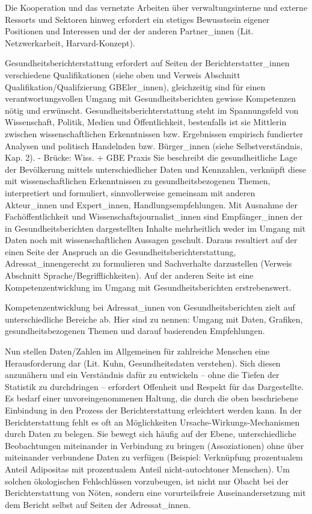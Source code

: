 \documentclass{article}
\begin{document}
Die Kooperation und das vernetzte Arbeiten über verwaltungsinterne und externe Ressorts und Sektoren hinweg erfordert ein stetiges Bewusstsein eigener Positionen und Interessen und der der anderen Partner\_innen (Lit. Netzwerkarbeit, Harvard-Konzept).


Gesundheitsberichterstattung erfordert auf Seiten der Berichterstatter\_innen verschiedene Qualifikationen (siehe oben und Verweis Abschnitt Qualifikation/Qualifzierung GBEler\_innen), gleichzeitig sind für einen verantwortungsvollen Umgang mit Gesundheitsberichten gewisse Kompetenzen nötig und erwünscht. Gesundheitsberichterstattung steht im Spannungsfeld von Wissenschaft, Politik, Medien und Öffentlichkeit, bestenfalls ist sie Mittlerin zwischen wissenschaftlichen Erkenntnissen bzw. Ergebnissen empirisch fundierter Analysen und politisch Handelnden bzw. Bürger\_innen (siehe Selbstverständnis, Kap. 2). - Brücke: Wiss. + GBE Praxis Sie beschreibt die gesundheitliche Lage der Bevölkerung mittels unterschiedlicher Daten und Kennzahlen, verknüpft diese mit wissenschaftlichen Erkenntnissen zu gesundheitsbezogenen Themen, interpretiert und formuliert, sinnvollerweise gemeinsam mit anderen Akteur\_innen und Expert\_innen,  Handlungsempfehlungen. Mit Ausnahme der Fachöffentlichkeit und Wissenschaftsjournalist\_innen sind Empfänger\_innen der in Gesundheitsberichten dargestellten Inhalte mehrheitlich weder im Umgang mit Daten noch mit wissenschaftlichen Aussagen geschult. Daraus resultiert auf der einen Seite der Anspruch an die Gesundheitsberichterstattung, Adressat\_innengerecht zu formulieren und Sachverhalte darzustellen (Verweis Abschnitt Sprache/Begrifflichkeiten). Auf der anderen Seite ist eine Kompetenzentwicklung im Umgang mit Gesundheitsberichten erstrebenswert.


Kompetenzentwicklung bei Adressat\_innen von Gesundheitsberichten zielt auf unterschiedliche Bereiche ab. Hier sind zu nennen: Umgang mit Daten, Grafiken, gesundheitsbezogenen Themen und darauf basierenden Empfehlungen. 

Nun stellen Daten/Zahlen im Allgemeinen für zahlreiche Menschen eine Herausforderung dar (Lit. Kuhn, Gesundheitsdaten verstehen). Sich diesen anzunähern und ein Verständnis dafür zu entwickeln – ohne die Tiefen der Statistik zu durchdringen – erfordert Offenheit und Respekt für das Dargestellte. Es bedarf einer unvoreingenommenen Haltung, die durch die oben beschriebene Einbindung in den Prozess der Berichterstattung erleichtert werden kann. In der Berichterstattung fehlt es oft an Möglichkeiten Ursache-Wirkungs-Mechanismen durch Daten zu belegen. Sie bewegt sich häufig auf der Ebene, unterschiedliche Beobachtungen miteinander in Verbindung zu bringen (Assoziationen) ohne über miteinander verbundene Daten zu verfügen (Beispiel: Verknüpfung prozentualem Anteil Adipositas mit prozentualem Anteil nicht-autochtoner Menschen). Um solchen ökologischen Fehlschlüssen vorzubeugen, ist nicht nur Obacht bei der Berichterstattung von Nöten, sondern eine vorurteilsfreie Auseinandersetzung mit dem Bericht selbst auf Seiten der Adressat\_innen.
\end{document}
